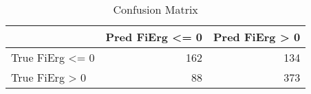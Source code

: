 \documentclass{article}
\begin{document}
\begin{table}
\caption{Confusion Matrix}
\label{tab:confusion-matrix}
\begin{tabular}{lrr}
\toprule
 & Pred FiErg <= 0 & Pred FiErg > 0 \\
\midrule
True FiErg <= 0 & 162 & 134 \\
True FiErg > 0 & 88 & 373 \\
\bottomrule
\end{tabular}
\end{table}
\end{document}
